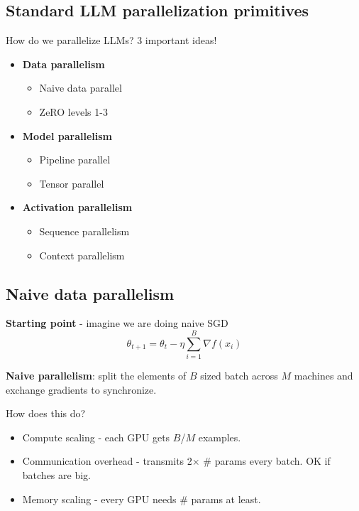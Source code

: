 \documentclass[12pt,twoside]{article}
\begin{document}
\subsection*{Standard LLM parallelization primitives}

How do we parallelize LLMs? 3 important ideas!

\begin{itemize}
    \item \textbf{Data parallelism} \begin{itemize}
        \item Naive data parallel 
        \item ZeRO levels 1-3
    \end{itemize}
    \item \textbf{Model parallelism} \begin{itemize}
        \item Pipeline parallel
        \item Tensor parallel
    \end{itemize}
    \item \textbf{Activation parallelism} \begin{itemize}
        \item Sequence parallelism
        \item Context parallelism
    \end{itemize}
\end{itemize}

\subsection*{Naive data parallelism}

\textbf{Starting point} - imagine we are doing naive SGD
\[
    \theta_{t + 1} = \theta_{t} - \eta \sum_{i = 1}^B \nabla f(x_i)
\]

\textbf{Naive parallelism}: split the elements of \(B\) sized batch across \(M\) machines and exchange gradients to synchronize. 

\begin{question}
    How does this do?
\end{question}

\begin{itemize}
    \item Compute scaling - each GPU gets \(B\)/\(M\) examples.
    \item Communication overhead - transmits 2\(\times\) \# params every batch. OK if batches are big.
    \item Memory scaling - every GPU needs \# params at least.
\end{itemize}
\end{document}
